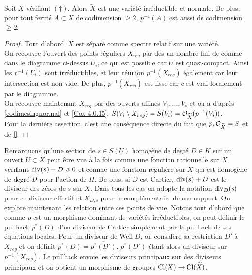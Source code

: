 \begin{prop}
Soit $X$ vérifiant $(\dagger)$. Alors $\widetilde{X}$ est une variété irréductible et normale. De plus, pour tout fermé $A\subset X$ de codimension $\geq 2$, $p^{-1}(A)$ est aussi de codimension $\geq 2$.
\end{prop}
\begin{proof}
Tout d'abord, $\widetilde{X}$ est séparé comme spectre relatif sur une variété.\\
On recouvre l'ouvert des points réguliers $X_{reg}$ par des un nombre fini de comme dans le diagramme ci-dessus $U_i$, ce qui est possible car $U$ est quasi-compact. Ainsi les $p^{-1}(U_i)$ sont irréductibles, et leur réunion $p^{-1}(X_{reg})$ également car leur intersection est non-vide. De plus, $p^{-1}(X_{reg})$ est lisse car c'est vrai localement par le diagramme.\\
On recouvre maintenant $X_{reg}$ par des ouverts affines $V_1,...,V_s$ et on a d'après \ref{codimesingnormal} et \ref{Cox 4.0.15}, $S(V_i\setminus X_{reg})=S(V_i)=\mathcal{O}_{\widetilde{X}}(p^{-1}(V_i))$.\\
Pour la dernière assertion, c'est une conséquence directe du fait que $p_*\mathcal{O}_{\widetilde{X}}=S$ et de \ref{}.
\end{proof}

Remarquons qu'une section de $s\in S(U)$ homogène de degré $D\in K$ sur un ouvert $U\subset X$ peut être vue à la fois comme une fonction rationnelle sur $X$ vérifiant $\operatorname{div}(s)+D\geqslant 0$ et comme une fonction régulière sur $\widetilde{X}$ qui est homogène de degré $D$ pour l'action de $H$. De plus, si $D$ est Cartier, $\operatorname{div}(s)+D$ est le diviseur des zéros de $s$ sur $X$. Dans tous les cas on adopte la notation $\operatorname{div}_D(s)$ pour ce diviseur effectif et $X_{D,s}$ pour le complémentaire de son support. On explore maintenant les relation entre ces points de vue. Notons tout d'abord que comme $p$ est un morphisme dominant de variétés irréductibles, on peut définir le pullback $p^*(D)$ d'un diviseur de Cartier simplement par le pullback de ses équations locales. Pour un diviseur de Weil $D$, on considère sa restriction $D'$ à $X_{reg}$ et on définit $p^*(D)=\overline{p^*(D')}$, $p^*(D')$ étant alors un diviseur sur $p^{-1}(X_{reg})$. Le pullback envoie les diviseurs principaux sur des diviseurs principaux et on obtient un morphisme de groupes $\operatorname{Cl}(X)\rightarrow \operatorname{Cl}(\widetilde{X})$.

